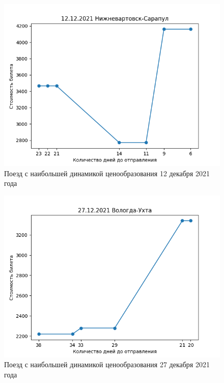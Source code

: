 \documentclass[conference]{IEEEtran}
\begin{document}
\begin{figure}[h!]
	\includegraphics[scale=0.5]{12122021}
	\caption{Поезд с наибольшей динамикой ценообразования 12 декабря 2021 года}
\end{figure}

\begin{figure}[h!]
	\includegraphics[scale=0.5]{27122021}
	\caption{Поезд с наибольшей динамикой ценообразования 27 декабря 2021 года}
\end{figure}
\end{document}
